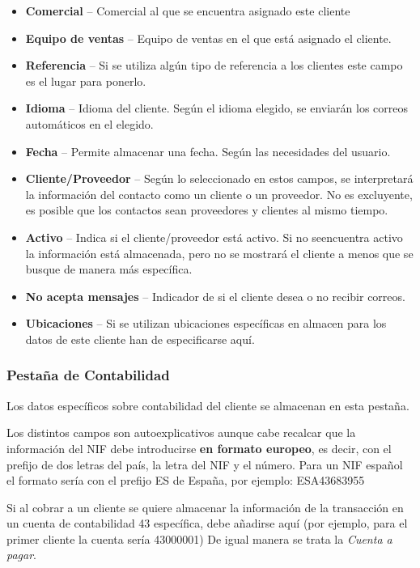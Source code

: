 \begin{itemize}
  \item \textbf{Comercial} -- Comercial al que se encuentra asignado este cliente
  \item \textbf{Equipo de ventas} -- Equipo de ventas en el que está asignado el cliente.
  \item \textbf{Referencia} -- Si se utiliza algún tipo de referencia a los clientes
        este campo es el lugar para ponerlo.
  \item \textbf{Idioma} -- Idioma del cliente. Según el idioma elegido, se enviarán los correos automáticos
        en el elegido.
  \item \textbf{Fecha} -- Permite almacenar una fecha. Según las necesidades del usuario.
  \item \textbf{Cliente/Proveedor} -- Según lo seleccionado en estos campos, se interpretará la información
        del contacto como un cliente o un proveedor. No es excluyente, es posible que los contactos sean
        proveedores y clientes al mismo tiempo.
  \item \textbf{Activo} -- Indica si el cliente/proveedor está activo. Si no seencuentra activo
        la información está almacenada, pero no se mostrará el cliente a menos que se busque de manera más
        específica.
  \item \textbf{No acepta mensajes} -- Indicador de si el cliente desea o no recibir correos.
  \item \textbf{Ubicaciones} -- Si se utilizan ubicaciones específicas en almacen para los datos de este cliente
        han de especificarse aquí.
\end{itemize}


\subsubsection{Pestaña de Contabilidad}
Los datos específicos sobre contabilidad del cliente se almacenan en esta pestaña.

Los distintos campos son autoexplicativos aunque cabe recalcar que la información del NIF debe introducirse
\textbf{en formato europeo}, es decir, con el prefijo de dos letras del país, la letra del NIF y el número. Para un NIF
español el formato sería con el prefijo ES de España, por ejemplo: ESA43683955 

Si al cobrar a un cliente se quiere almacenar la información de la transacción en un cuenta de contabilidad
43 específica, debe añadirse aquí (por ejemplo, para el primer cliente la cuenta sería 43000001)
De igual manera se trata la \emph{Cuenta a pagar}.

